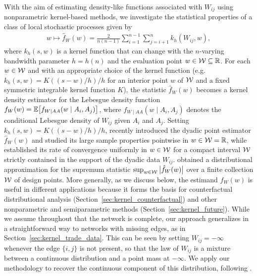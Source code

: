 With the aim of estimating density-like functions associated with $W_{i j}$
using nonparametric kernel-based methods, we investigate the statistical
properties of a class of local stochastic processes given by
%
\begin{align}\label{eq:kernel_estimator}
  w \mapsto \hat{f}_W(w)
  = \frac{2}{n(n-1)} \sum_{i=1}^{n-1} \sum_{j=i+1}^n k_h(W_{i j},w),
\end{align}
%
where $k_h(s,w)$ is a kernel function that can change with the $n$-varying
bandwidth parameter $h=h(n)$ and the evaluation point $w \in \mathcal{W}\subseteq \mathbb{R}$.
For each $w\in\mathcal{W}$ and with an appropriate choice of the kernel function
(e.g.\ $k_h(s,w)=K((s-w)/h)/h$ for an interior point $w$ of $\mathcal{W}$ and a
fixed symmetric integrable kernel function $K$), the statistic $\hat{f}_W(w)$
becomes a kernel density estimator for the Lebesgue density function
$f_W(w) = \mathbb{E}\big[f_{W \mid AA}(w \mid A_i,A_j)\big]$, where
$f_{W \mid AA}(w \mid A_i,A_j)$ denotes the conditional Lebesgue density of
$W_{i j}$ given $A_i$ and $A_j$. Setting $k_h(s,w)=K((s-w)/h)/h$,
\citet{graham2024kernel} recently introduced the dyadic point estimator
$\hat{f}_W(w)$ and studied its large sample properties pointwise in
$w\in\mathcal{W}=\mathbb{R}$, while \citet{chiang2020empirical} established its rate of
convergence uniformly in $w\in\mathcal{W}$ for a compact interval $\mathcal{W}$ strictly
contained in the support of the dyadic data $W_{i j}$.
\citet{chiang2022inference} obtained a distributional approximation for the
supremum statistic $\sup_{w\in\mathcal{W}}\big|\hat{f}_W(w)\big|$ over a finite
collection $\mathcal{W}$ of design points. More generally, as we discuss below, the
estimand $f_W(w)$ is useful in different applications because it forms the
basis for counterfactual distributional analysis
(Section~\ref{sec:kernel_counterfactual}) and other nonparametric and
semiparametric
methods (Section~\ref{sec:kernel_future}). While we assume throughout
that the network is complete, our approach generalizes in a straightforward way
to networks with missing edges, as in Section~\ref{sec:kernel_trade_data}.
This can be
seen by setting $W_{i j} = -\infty$ whenever the edge $\{i, j\}$ is not
present, so that the law of $W_{i j}$ is a mixture between a continuous
distribution and a point mass at $-\infty$. We apply our methodology to
recover the continuous component of this distribution, following
\citet{chiang2022inference}.

